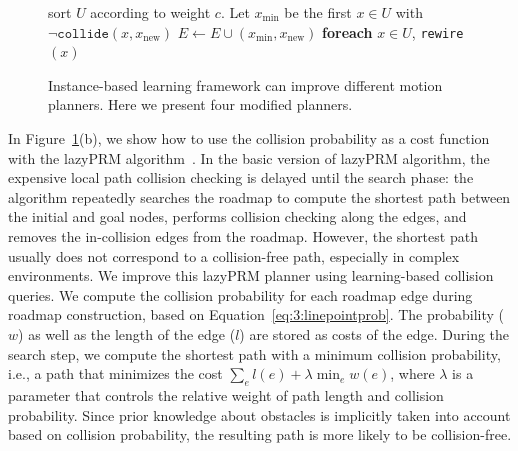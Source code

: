 \begin{figure}[H]
{{\begin{minipage}{0.48\linewidth}
\begin{algorithmic}
        \STATE \quad \quad \quad sort $U$ according to weight $c$.
        \STATE \quad \quad \quad Let $x_{\text{min}}$ be the first $x \in U$ with $\neg \texttt{collide}(x, x_{\text{new}})$
        \STATE \quad \quad \quad $E \leftarrow E \cup (x_{\text{min}}, x_{\text{new}})$
        \STATE \quad \quad \quad \textbf{foreach} $x \in U$, \texttt{rewire}$(x)$
      \end{algorithmic}
  \end{minipage}}}
  \caption[Instance-based learning framework can be easily integrated with different motion planners]{Instance-based learning framework can improve different motion planners. Here we present four modified planners.}
  \label{fig:3:planners}
\end{figure}

In Figure~\ref{fig:3:planners}(b), we show how to use the collision probability as a cost function with the lazyPRM algorithm~\cite{Kavraki96}. In the basic version of lazyPRM algorithm, the expensive local path collision checking is delayed until the search phase: the algorithm repeatedly searches the roadmap to compute the shortest path between the initial and goal nodes, performs collision checking along the edges, and removes the in-collision edges from the roadmap. However, the shortest path usually does not correspond to a collision-free path, especially in complex environments. We improve this lazyPRM planner using learning-based collision queries. We compute the collision probability for each roadmap edge during roadmap construction, based on Equation~\ref{eq:3:linepointprob}. The probability ($w$) as well as the length of the edge ($l$) are stored as costs of the edge. During the search step, we compute the shortest path with a minimum collision probability, i.e., a path that minimizes the cost $\sum_{e} l(e) + \lambda \min_{e} w(e)$, where $\lambda$ is a parameter that controls the relative weight of path length and collision probability. Since prior knowledge about obstacles is implicitly taken into account based on collision probability, the resulting path is more likely to be collision-free.


